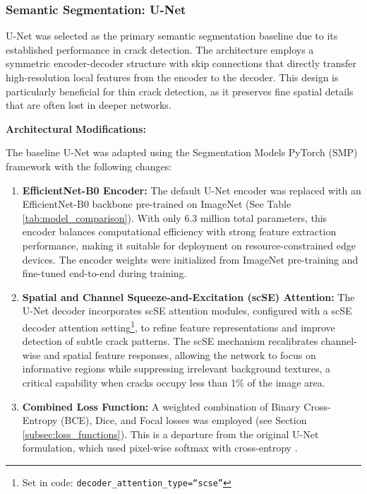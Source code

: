 \subsubsection{Semantic Segmentation: U-Net}
\hs U-Net was selected as the primary semantic segmentation baseline due to its established performance in crack detection. The architecture employs a symmetric encoder-decoder structure with skip connections that directly transfer high-resolution local features from the encoder to the decoder. This design is particularly beneficial for thin crack detection, as it preserves fine spatial details that are often lost in deeper networks.

\textbf{Architectural Modifications:}

\hs The baseline U-Net was adapted using the Segmentation Models PyTorch (SMP) framework with the following changes:

\begin{enumerate}
    \item \textbf{EfficientNet-B0 Encoder:} The default U-Net encoder was replaced with an EfficientNet-B0 backbone pre-trained on ImageNet (See Table \ref{tab:model_comparison}). With only 6.3 million total parameters, this encoder balances computational efficiency with strong feature extraction performance, making it suitable for deployment on resource-constrained edge devices. The encoder weights were initialized from ImageNet pre-training and fine-tuned end-to-end during training.

    \item \textbf{Spatial and Channel Squeeze-and-Excitation (scSE) Attention:} The U-Net decoder incorporates scSE attention modules, configured with a scSE decoder attention setting\footnote{Set in code: \texttt{decoder\_attention\_type=``scse''}}, to refine feature representations and improve detection of subtle crack patterns. The scSE mechanism recalibrates channel-wise and spatial feature responses, allowing the network to focus on informative regions while suppressing irrelevant background textures, a critical capability when cracks occupy less than 1\% of the image area.

    \item \textbf{Combined Loss Function:} A weighted combination of Binary Cross-Entropy (BCE), Dice, and Focal losses was employed (see Section \ref{subsec:loss_functions}). This is a departure from the original U-Net formulation, which used pixel-wise softmax with cross-entropy \cite{30-ronneberger-2015-unet}.
\end{enumerate}

